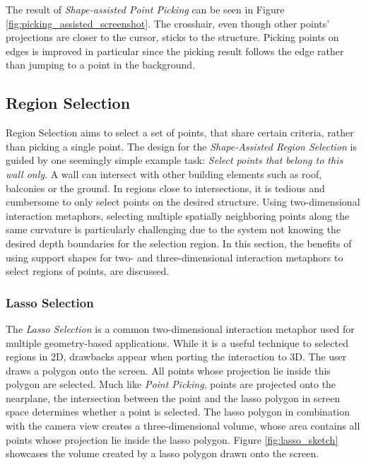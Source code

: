 The result of \textit{Shape-assisted Point Picking} can be seen in Figure \ref{fig:picking_assisted_screenshot}. The crosshair, even though other points' projections are closer to the cursor, sticks to the structure. Picking points on edges is improved in particular since the picking result follows the edge rather than jumping to a point in the background. 


\subsection{Region Selection}
\label{sec:regionSelection}

Region Selection aims to select a set of points, that share certain criteria, rather than picking a single point. 
The design for the \textit{Shape-Assisted Region Selection} is guided by one seemingly simple example task: \textit{Select points that belong to this wall only}. A wall can intersect with other building elements such as roof, balconies or the ground. In regions close to intersections, it is tedious and cumbersome to only select points on the desired structure. Using two-dimensional interaction metaphors, selecting multiple spatially neighboring points along the same curvature is particularly challenging due to the system not knowing the desired depth boundaries for the selection region. In this section, the benefits of using support shapes for two- and three-dimensional interaction metaphors to select regions of points,  are discussed. 


\subsubsection{Lasso Selection}

The \textit{Lasso Selection} is a common two-dimensional interaction metaphor used for multiple geometry-based applications. While it is a useful technique to selected regions in 2D, drawbacks appear when porting the interaction to 3D. The user draws a polygon onto the screen. All points whose projection lie inside this polygon are selected. Much like \textit{Point Picking}, points are projected onto the nearplane, the intersection between the point and the lasso polygon in screen space determines whether a point is selected. The lasso polygon in combination with the camera view creates a three-dimensional volume, whose area contains all points whose projection lie inside the lasso polygon. Figure \ref{fig:lasso_sketch} showcases the volume created by a lasso polygon drawn onto the screen.

